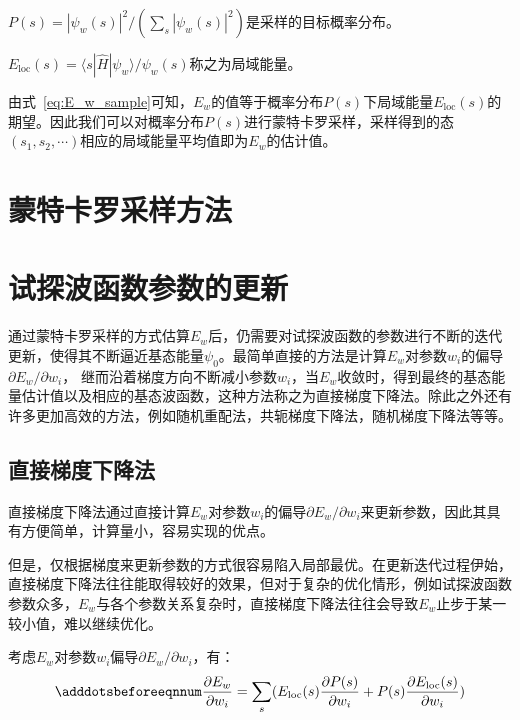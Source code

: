 $P(s)=|\psi_{w}(s)|^{2} /(\sum\limits_{s}|\psi_{w}(s)|^{2})$是采样的目标概率分布。

$E_{\text{loc}}(s)=\langle s|\hat{H}|\psi_{w}\rangle/\psi_{w}(s)$称之为局域能量。

由式~\eqref{eq:E_w_sample}可知，$E_w$的值等于概率分布$P(s)$下局域能量$E_{\text{loc}}(s)$的期望。因此我们可以对概率分布$P(s)$进行蒙特卡罗采样，采样得到的态$(s_1, s_2, \cdots)$相应的局域能量平均值即为$E_w$的估计值。

\section{蒙特卡罗采样方法}

\section{试探波函数参数的更新}
通过蒙特卡罗采样的方式估算$E_w$后，仍需要对试探波函数的参数进行不断的迭代更新，使得其不断逼近基态能量$\psi_0$。最简单直接的方法是计算$E_w$对参数$w_i$的偏导$\partial E_{w}/\partial w_{i}$，
继而沿着梯度方向不断减小参数$w_i$，当$E_w$收敛时，得到最终的基态能量估计值以及相应的基态波函数，这种方法称之为直接梯度下降法。除此之外还有许多更加高效的方法，例如随机重配法\citep{sorella2001generalized}，共轭梯度下降法，随机梯度下降法等等。
\subsection{直接梯度下降法}
直接梯度下降法通过直接计算$E_w$对参数$w_i$的偏导$\partial E_{w}/\partial w_{i}$来更新参数，因此其具有方便简单，计算量小，容易实现的优点。

但是，仅根据梯度来更新参数的方式很容易陷入局部最优。在更新迭代过程伊始，直接梯度下降法往往能取得较好的效果，但对于复杂的优化情形，例如试探波函数
参数众多，$E_{w}$与各个参数关系复杂时，直接梯度下降法往往会导致$E_{w}$止步于某一较小值，难以继续优化。

考虑$E_w$对参数$w_i$偏导$\partial E_{w}/\partial w_{i}$，有：
\begin{equation} \label{eq:E_w_partial}
    \adddotsbeforeeqnnum%
    \frac{\partial E_w}{\partial w_i} = \sum_{s} (E_{\text{loc}}(s)\frac{\partial P(s)}{\partial w_i} + P(s)\frac{\partial E_{\text{loc}}(s)}{\partial w_i})
\end{equation}

